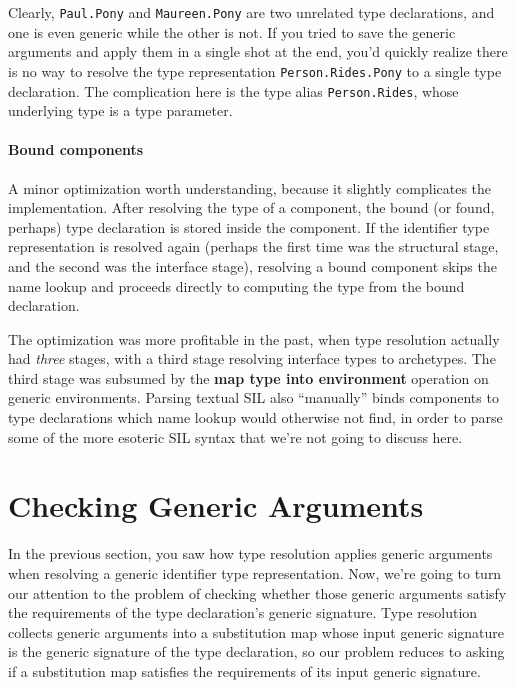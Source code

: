 \documentclass[../generics]{subfiles}
\begin{document}
\begin{example}
Clearly, \texttt{Paul.Pony} and \texttt{Maureen.Pony} are two unrelated type declarations, and one is even generic while the other is not. If you tried to save the generic arguments and apply them in a single shot at the end, you'd quickly realize there is no way to resolve the type representation \texttt{Person.Rides.Pony} to a single type declaration. The complication here is the type alias \texttt{Person.Rides}, whose underlying type is a type parameter.

\end{example}

\paragraph{Bound components} A minor optimization worth understanding, because it slightly complicates the implementation. After resolving the type of a component, the bound (or found, perhaps) type declaration is stored inside the component. If the identifier type representation is resolved again (perhaps the first time was the structural stage, and the second was the interface stage), resolving a bound component skips the name lookup and proceeds directly to computing the type from the bound declaration.

The optimization was more profitable in the past, when type resolution actually had \emph{three} stages, with a third stage resolving interface types to archetypes. The third stage was subsumed by the \textbf{map type into environment} operation on generic environments. Parsing textual SIL also ``manually'' binds components to type declarations which name lookup would otherwise not find, in order to parse some of the more esoteric SIL syntax that we're not going to discuss here.

\section{Checking Generic Arguments}\label{checking generic arguments}

In the previous section, you saw how type resolution applies generic arguments when resolving a generic identifier type representation. Now, we're going to turn our attention to the problem of checking whether those generic arguments satisfy the requirements of the type declaration's generic signature. Type resolution collects generic arguments into a substitution map whose input generic signature is the generic signature of the type declaration, so our problem reduces to asking if a substitution map satisfies the requirements of its input generic signature.
\end{document}
